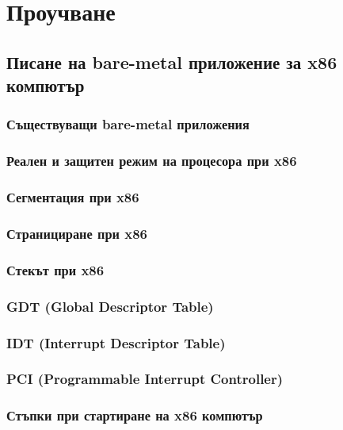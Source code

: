 \chapter{Проучване} %
\hfill
\section{Писане на bare-metal приложение за x86 компютър}
  \subsection{Съществуващи bare-metal приложения}

  \subsection{Реален и защитен режим на процесора при x86}

  \subsection{Сегментация при x86}

  \subsection{Странициране при x86}

  \subsection{Стекът при x86}

  \subsection{GDT (Global Descriptor Table)}

  \subsection{IDT (Interrupt Descriptor Table)}

  \subsection{PCI (Programmable Interrupt Controller)} %

  \subsection{Стъпки при стартиране на x86 компютър}

